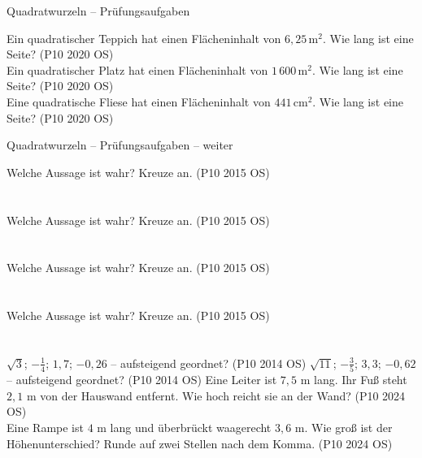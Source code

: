 \begin{aufgabe}{Quadratwurzeln – Prüfungsaufgaben}
\begin{teile}
\teil Ein quadratischer Teppich hat einen Flächeninhalt von $6{,}25\,\text{m}^2$. Wie lang ist eine Seite? \hfill (P10 2020 OS) \\ \leerfeld[m]
\teil Ein quadratischer Platz hat einen Flächeninhalt von $1\,600\,\text{m}^2$. Wie lang ist eine Seite? \hfill (P10 2020 OS) \\ \leerfeld[m]
\teil Eine quadratische Fliese hat einen Flächeninhalt von $441\,\text{cm}^2$. Wie lang ist eine Seite? \hfill (P10 2020 OS) \\ \leerfeld[cm]
\end{teile}
\end{aufgabe}

\begin{aufgabe}{Quadratwurzeln – Prüfungsaufgaben – weiter}
\begin{teile}
\steil Welche Aussage ist wahr? Kreuze an. \hfill (P10 2015 OS)\\  \\  \\ 
\steil Welche Aussage ist wahr? Kreuze an. \hfill (P10 2015 OS)\\  \\  \\ 
\teil Welche Aussage ist wahr? Kreuze an. \hfill (P10 2015 OS)\\  \\  \\ 
\teil Welche Aussage ist wahr? Kreuze an. \hfill (P10 2015 OS)\\  \\  \\ 
\teil $\sqrt{3}$; $-\frac{1}{4}$; $1{,}7$; $-0{,}26$ – aufsteigend geordnet? \hfill (P10 2014 OS)
\teil $\sqrt{11}$; $-\frac{3}{5}$; $3{,}3$; $-0{,}62$ – aufsteigend geordnet? \hfill (P10 2014 OS)
\teil Eine Leiter ist $7{,}5$ m lang. Ihr Fuß steht $2{,}1$ m von der Hauswand entfernt. Wie hoch reicht sie an der Wand? \hfill (P10 2024 OS) \\ \leerfeld[m]
\teil Eine Rampe ist $4$ m lang und überbrückt waagerecht $3{,}6$ m. Wie groß ist der Höhenunterschied? Runde auf zwei Stellen nach dem Komma. \hfill (P10 2024 OS) \\ \leerfeld[m]

\end{teile}
\end{aufgabe}
